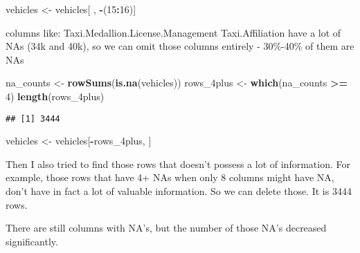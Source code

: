 \documentclass[
]{article}
\newenvironment{Shaded}{\begin{snugshade}}{\end{snugshade}}
\newcommand{\DecValTok}[1]{\textcolor[rgb]{0.00,0.00,0.81}{#1}}
\newcommand{\FunctionTok}[1]{\textcolor[rgb]{0.13,0.29,0.53}{\textbf{#1}}}
\newcommand{\NormalTok}[1]{#1}
\newcommand{\OtherTok}[1]{\textcolor[rgb]{0.56,0.35,0.01}{#1}}
\newcommand{\SpecialCharTok}[1]{\textcolor[rgb]{0.81,0.36,0.00}{\textbf{#1}}}
\begin{document}
\begin{Shaded}
\begin{Highlighting}[]
\NormalTok{vehicles }\OtherTok{\textless{}{-}}\NormalTok{ vehicles[ , }\SpecialCharTok{{-}}\NormalTok{(}\DecValTok{15}\SpecialCharTok{:}\DecValTok{16}\NormalTok{)]}
\end{Highlighting}
\end{Shaded}

columns like: Taxi.Medallion.License.Management Taxi.Affiliation have a
lot of NAs (34k and 40k), so we can omit those columns entirely -
30\%-40\% of them are NAs

\begin{Shaded}
\begin{Highlighting}[]
\NormalTok{na\_counts }\OtherTok{\textless{}{-}} \FunctionTok{rowSums}\NormalTok{(}\FunctionTok{is.na}\NormalTok{(vehicles))}
\NormalTok{rows\_4plus }\OtherTok{\textless{}{-}} \FunctionTok{which}\NormalTok{(na\_counts }\SpecialCharTok{\textgreater{}=} \DecValTok{4}\NormalTok{)}
\FunctionTok{length}\NormalTok{(rows\_4plus)   }
\end{Highlighting}
\end{Shaded}

\begin{verbatim}
## [1] 3444
\end{verbatim}

\begin{Shaded}
\begin{Highlighting}[]
\NormalTok{vehicles }\OtherTok{\textless{}{-}}\NormalTok{ vehicles[}\SpecialCharTok{{-}}\NormalTok{rows\_4plus, ]}
\end{Highlighting}
\end{Shaded}

Then I also tried to find those rows that doesn't possess a lot of
information. For example, those rows that have 4+ NAs when only 8
columns might have NA, don't have in fact a lot of valuable information.
So we can delete those. It is 3444 rows.

There are still columns with NA's, but the number of those NA's
decreased significantly.

\begin{Shaded}
\end{Shaded}
\end{document}
